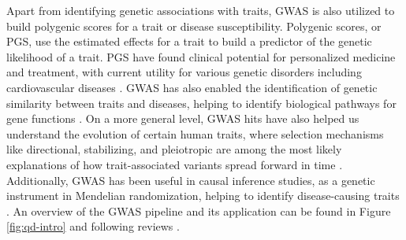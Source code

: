 Apart from identifying genetic associations with traits, GWAS is also utilized to build polygenic scores for a trait or disease susceptibility. Polygenic scores, or PGS, use the estimated effects for a trait to build a predictor of the genetic likelihood of a trait. PGS have found clinical potential for personalized medicine and treatment, with current utility for various genetic disorders including cardiovascular diseases \cite{torkamani2018personal}. GWAS has also enabled the identification of genetic similarity between traits and diseases, helping to identify biological pathways for gene functions \cite{solovieff2013pleiotropy}. On a more general level, GWAS hits have also helped us understand the evolution of certain human traits, where selection mechanisms like directional, stabilizing, and pleiotropic are among the most likely explanations of how trait-associated variants spread forward in time \cite{simons2018population}. Additionally, GWAS has been useful in causal inference studies, as a genetic instrument in Mendelian randomization, helping to identify disease-causing traits \cite{davey2014mendelian, pingault2018using}. An overview of the GWAS pipeline and its application can be found in Figure \ref{fig:qd-intro} and following reviews \cite{visscher201710, abdellaoui202315}.


